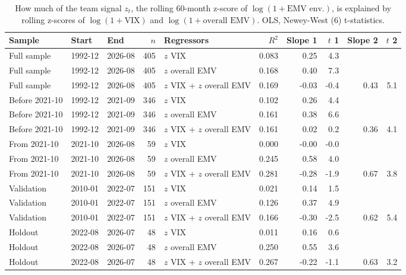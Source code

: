 \begin{table}[H]
\centering\small
\caption{How much of the team signal $z_t$, the rolling 60-month z-score of $\log(1+\text{EMV env.})$, is explained by rolling z-scores of $\log(1+\text{VIX})$ and $\log(1+\text{overall EMV})$. OLS, Newey-West (6) t-statistics.}
\label{tab:m1_decomp}
\begin{adjustbox}{max width=\linewidth}
\begin{tabular}{lllrlrrrrr}
\toprule
Sample & Start & End & $n$ & Regressors & $R^2$ & Slope 1 & $t$ 1 & Slope 2 & $t$ 2 \\
\midrule
Full sample & 1992-12 & 2026-08 & 405 & $z$ VIX & 0.083 & 0.25 & 4.3 &  &  \\
Full sample & 1992-12 & 2026-08 & 405 & $z$ overall EMV & 0.168 & 0.40 & 7.3 &  &  \\
Full sample & 1992-12 & 2026-08 & 405 & $z$ VIX + $z$ overall EMV & 0.169 & -0.03 & -0.4 & 0.43 & 5.1 \\
Before 2021-10 & 1992-12 & 2021-09 & 346 & $z$ VIX & 0.102 & 0.26 & 4.4 &  &  \\
Before 2021-10 & 1992-12 & 2021-09 & 346 & $z$ overall EMV & 0.161 & 0.38 & 6.6 &  &  \\
Before 2021-10 & 1992-12 & 2021-09 & 346 & $z$ VIX + $z$ overall EMV & 0.161 & 0.02 & 0.2 & 0.36 & 4.1 \\
From 2021-10 & 2021-10 & 2026-08 & 59 & $z$ VIX & 0.000 & -0.00 & -0.0 &  &  \\
From 2021-10 & 2021-10 & 2026-08 & 59 & $z$ overall EMV & 0.245 & 0.58 & 4.0 &  &  \\
From 2021-10 & 2021-10 & 2026-08 & 59 & $z$ VIX + $z$ overall EMV & 0.281 & -0.28 & -1.9 & 0.67 & 3.8 \\
Validation & 2010-01 & 2022-07 & 151 & $z$ VIX & 0.021 & 0.14 & 1.5 &  &  \\
Validation & 2010-01 & 2022-07 & 151 & $z$ overall EMV & 0.126 & 0.37 & 4.9 &  &  \\
Validation & 2010-01 & 2022-07 & 151 & $z$ VIX + $z$ overall EMV & 0.166 & -0.30 & -2.5 & 0.62 & 5.4 \\
Holdout & 2022-08 & 2026-07 & 48 & $z$ VIX & 0.011 & 0.16 & 0.6 &  &  \\
Holdout & 2022-08 & 2026-07 & 48 & $z$ overall EMV & 0.250 & 0.55 & 3.6 &  &  \\
Holdout & 2022-08 & 2026-07 & 48 & $z$ VIX + $z$ overall EMV & 0.267 & -0.22 & -1.1 & 0.63 & 3.2 \\
\bottomrule
\end{tabular}
\end{adjustbox}
\end{table}
